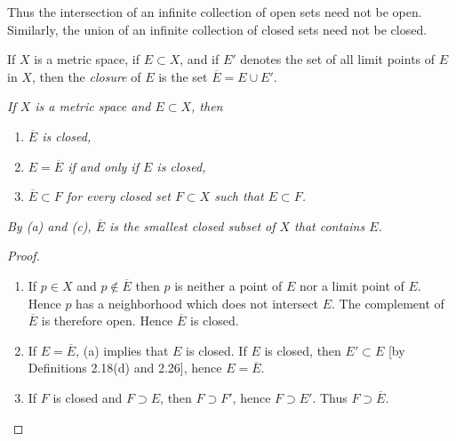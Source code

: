 Thus the intersection of an infinite collection of open sets need not be open.
Similarly, the union of an infinite collection of closed sets need not be
closed.

\begin{center}
\end{center}

If $X$ is a metric space, if $E \subset X$, and if $E'$ denotes the set of all
limit points of $E$ in $X$, then the \emph{closure} of $E$ is the set
$\overline{E} = E \cup E'$.

\emph{If $X$ is a metric space and $E \subset X$, then}
\begin{enumerate}[label=(\alph*), leftmargin=2.2em, itemsep=1pt, topsep=3pt]
  \item \emph{$\overline{E}$ is closed,}
  \item \emph{$E = \overline{E}$ if and only if $E$ is closed,}
  \item \emph{$\overline{E} \subset F$ for every closed set $F \subset X$ such
        that $E \subset F$.}
\end{enumerate}
\emph{By (a) and (c), $\overline{E}$ is the smallest closed subset of $X$ that
contains $E$.}

\begin{proof}
\begin{enumerate}[label=(\alph*), leftmargin=2.2em, itemsep=4pt, topsep=3pt]
  \item If $p \in X$ and $p \notin \overline{E}$ then $p$ is neither a point of
        $E$ nor a limit point of $E$. Hence $p$ has a neighborhood which does
        not intersect $E$. The complement of $\overline{E}$ is therefore open.
        Hence $\overline{E}$ is closed.
  \item If $E = \overline{E}$, (a) implies that $E$ is closed. If $E$ is
        closed, then $E' \subset E$ [by Definitions 2.18(d) and 2.26], hence
        $E = \overline{E}$.
  \item If $F$ is closed and $F \supset E$, then $F \supset F'$, hence
        $F \supset E'$. Thus $F \supset \overline{E}$.
\end{enumerate}
\end{proof}

